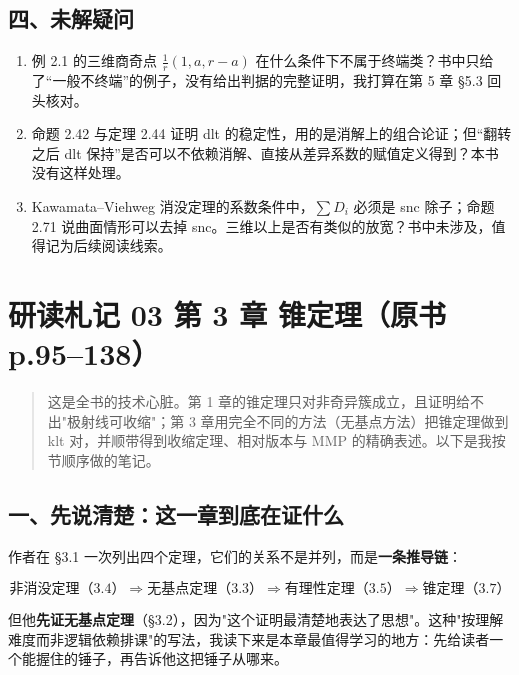 \subsection*{四、未解疑问}

\begin{enumerate}
\item 例 2.1 的三维商奇点 $\frac1r(1,a,r-a)$ 在什么条件下不属于终端类？书中只给了“一般不终端”的例子，没有给出判据的完整证明，我打算在第 5 章 \S5.3 回头核对。
\item 命题 2.42 与定理 2.44 证明 dlt 的稳定性，用的是消解上的组合论证；但“翻转之后 dlt 保持”是否可以不依赖消解、直接从差异系数的赋值定义得到？本书没有这样处理。
\item Kawamata--Viehweg 消没定理的系数条件中，$\sum D_i$ 必须是 snc 除子；命题 2.71 说曲面情形可以去掉 snc。三维以上是否有类似的放宽？书中未涉及，值得记为后续阅读线索。
\end{enumerate}

\section*{研读札记 03 \textperiodcentered{} 第 3 章 锥定理（原书 p.95--138）}

\begin{quote}\small 这是全书的技术心脏。第 1 章的锥定理只对非奇异簇成立，且证明给不出"极射线可收缩"；第 3 章用完全不同的方法（无基点方法）把锥定理做到 klt 对，并顺带得到收缩定理、相对版本与 MMP 的精确表述。以下是我按节顺序做的笔记。\end{quote}

\subsection*{一、先说清楚：这一章到底在证什么}

作者在 \S3.1 一次列出四个定理，它们的关系不是并列，而是\textbf{一条推导链}：

\[
\text{非消没定理（3.4）}\Rightarrow\text{无基点定理（3.3）}\Rightarrow\text{有理性定理（3.5）}\Rightarrow\text{锥定理（3.7）}
\]

但他\textbf{先证无基点定理}（\S3.2），因为"这个证明最清楚地表达了思想"。这种"按理解难度而非逻辑依赖排课"的写法，我读下来是本章最值得学习的地方：先给读者一个能握住的锤子，再告诉他这把锤子从哪来。

